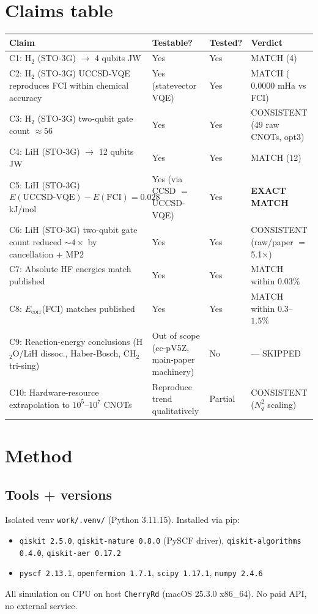\documentclass[11pt]{article}
\begin{document}
\section{Claims table}

\begin{longtable}{p{} p{} p{} p{}}
\toprule
Claim & Testable? & Tested? & Verdict \\
\midrule
\endhead
C1: H$_2$ (STO-3G) $\to$ 4 qubits JW & Yes & Yes & MATCH (4) \\
C2: H$_2$ (STO-3G) UCCSD-VQE reproduces FCI within chemical accuracy & Yes (statevector VQE) & Yes & MATCH ($0.0000$ mHa vs FCI) \\
C3: H$_2$ (STO-3G) two-qubit gate count $\approx 56$ & Yes & Yes & CONSISTENT (49 raw CNOTs, opt3) \\
C4: LiH (STO-3G) $\to$ 12 qubits JW & Yes & Yes & MATCH (12) \\
C5: LiH (STO-3G) $E(\text{UCCSD-VQE})-E(\text{FCI}) = 0.028$ kJ/mol & Yes (via CCSD $=$ UCCSD-VQE) & Yes & \textbf{EXACT MATCH} \\
C6: LiH (STO-3G) two-qubit gate count reduced $\sim 4\times$ by cancellation $+$ MP2 & Yes & Yes & CONSISTENT (raw/paper $=$ 5.1$\times$) \\
C7: Absolute HF energies match published & Yes & Yes & MATCH within $0.03\%$ \\
C8: $E_\text{corr}$(FCI) matches published & Yes & Yes & MATCH within $0.3$--$1.5\%$ \\
C9: Reaction-energy conclusions (H$_2$O/LiH dissoc., Haber-Bosch, CH$_2$ tri-sing) & Out of scope (cc-pV5Z, main-paper machinery) & No & --- SKIPPED \\
C10: Hardware-resource extrapolation to $10^5$--$10^7$ CNOTs & Reproduce trend qualitatively & Partial & CONSISTENT ($N_q^2$ scaling) \\
\bottomrule
\end{longtable}

\section{Method}

\subsection{Tools + versions}
Isolated venv \texttt{work/.venv/} (Python 3.11.15). Installed via pip:
\begin{itemize}
  \item \texttt{qiskit 2.5.0}, \texttt{qiskit-nature 0.8.0} (PySCF driver),
        \texttt{qiskit-algorithms 0.4.0}, \texttt{qiskit-aer 0.17.2}
  \item \texttt{pyscf 2.13.1}, \texttt{openfermion 1.7.1},
        \texttt{scipy 1.17.1}, \texttt{numpy 2.4.6}
\end{itemize}
All simulation on CPU on host \texttt{CherryRd} (macOS 25.3.0 x86\_64). No
paid API, no external service.
\end{document}
